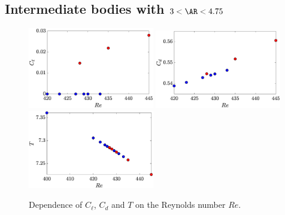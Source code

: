 \documentclass[onecolumn,notitlepage,superscriptaddress, amsmath,amssymb,longbibliographyaps,floatfix]{revtex4-1}
\begin{document}
\subsection{Intermediate bodies with $3 < \AR < 4.75$}


\begin{figure}
  \centering
  \includegraphics[width=0.49\textwidth]{./fig/AR4_Cl_Re.eps}
  \includegraphics[width=0.49\textwidth]{./fig/AR4_Cd_Re.eps}
  \includegraphics[width=0.49\textwidth]{./fig/AR4_T_Re.eps}
  \caption{Dependence of $C_\ell$, $C_d$ and $T$ on the Reynolds number $Re$.}
  \label{fig:Cl-Cd-AR4}
\end{figure}
\end{document}
